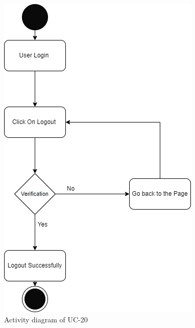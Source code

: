 \begin{figure}[H]
    \centering
    \includegraphics[scale=0.5]{./diagrams/Activity Diagram/ad-20.png}
    \caption{Activity diagram of UC-20}
    \label{fig:act-20}

\end{figure}

